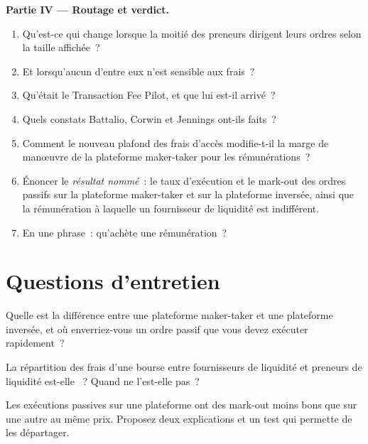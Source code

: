 \begin{problem}
\medskip\noindent\textbf{Partie IV --- Routage et verdict.}
\begin{enumerate}[resume]
\item Qu'est-ce qui change lorsque la moitié des preneurs dirigent leurs ordres selon la taille affichée~?
\item Et lorsqu'aucun d'entre eux n'est sensible aux frais~?
\item Qu'était le Transaction Fee Pilot, et que lui est-il arrivé~?
\item Quels constats Battalio, Corwin et Jennings ont-ils faits~?
\item Comment le nouveau plafond des frais d'accès modifie-t-il la marge de manœuvre de la plateforme maker-taker pour les rémunérations~?
\item Énoncer le \emph{résultat nommé}~: le taux d'exécution et le mark-out des ordres passifs sur la plateforme maker-taker et sur la plateforme inversée, ainsi que la rémunération à laquelle un
fournisseur de liquidité est indifférent.
\item En une phrase~: qu'achète une rémunération~?
\end{enumerate}
\end{problem}

\section{Questions d'entretien}

\begin{interviewq}\label{iq:mx:fees-rebates-and-venue-economics:1}
Quelle est la différence entre une plateforme maker-taker et une plateforme inversée, et où enverriez-vous un ordre passif que vous devez exécuter rapidement~?
\end{interviewq}

\begin{interviewq}\label{iq:mx:fees-rebates-and-venue-economics:2}
La répartition des frais d'une bourse entre fournisseurs de liquidité et preneurs de liquidité est-elle ~? Quand ne l'est-elle pas~?
\end{interviewq}

\begin{interviewq}\label{iq:mx:fees-rebates-and-venue-economics:3}
Les exécutions passives sur une plateforme ont des mark-out moins bons que sur une autre au même prix. Proposez deux explications et un test qui permette de les départager.
\end{interviewq}

